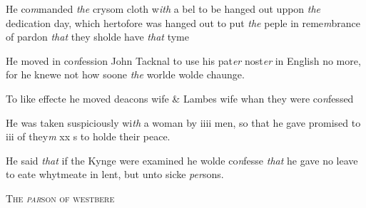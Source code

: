 \documentclass[12pt, a4paper]{book}
\begin{document}
				\marginpar[\vspace{0.5cm}{\textcolor{Gray}{crysom cloth 3}}]{}
			
		\ifthenelse{\isodd{\thepage}}
		{\reversemarginpar}
		{\normalmarginpar}
		He co\textit{m}manded \textit{the} crysom cloth w\textit{ith} a bel to be hanged out
 uppon \textit{the} dedication day, which hertofore was hanged
 out to put \textit{the} peple in reme\textit{m}brance of pardon \textit{that} they
 sholde have \textit{that} tyme
            	
			
				\marginpar[\vspace{0.5cm}{\textcolor{Gray}{4}}]{}
			
		\ifthenelse{\isodd{\thepage}}
		{\reversemarginpar}
		{\normalmarginpar}
		He moved in co\textit{n}fession John Tacknal to use his pat\textit{er} nost\textit{er}
 in English no more, for he knewe not how soone \textit{the}
 worlde wolde chaunge.
 

				\marginpar[\vspace{0.5cm}{\textcolor{Gray}{5}}]{}
			

		\ifthenelse{\isodd{\thepage}}
		{\reversemarginpar}
		{\normalmarginpar}
		To like effecte he moved deacons wife \& Lambes wife
 whan they were co\textit{n}fessed
            	
				\marginpar[\vspace{0.5cm}{\textcolor{Gray}{Incontynencie 6}}]{}
			
		\ifthenelse{\isodd{\thepage}}
		{\reversemarginpar}
		{\normalmarginpar}
		He was taken suspiciously wi\textit{th} a woman by iiii men,
            		so that he gave promised to iii of they\textit{m} xx s to holde their peace.
            	 
				\marginpar[\vspace{0.5cm}{\textcolor{Gray}{lent}}]{}
			 
				\marginpar[\vspace{0.5cm}{\textcolor{Gray}{7}}]{}
			
		\ifthenelse{\isodd{\thepage}}
		{\reversemarginpar}
		{\normalmarginpar}
		He said \textit{that} if the Kynge were examined he wolde co\textit{n}fesse
 \textit{that} he gave no leave to eate whytmeate in lent, but
 unto sicke \textit{per}sons.
 

            
            	
				\begin{center} \begin{large} {\scshape The \textit{par}son of westbere} \end{large} \end{center}
			
\end{document}
